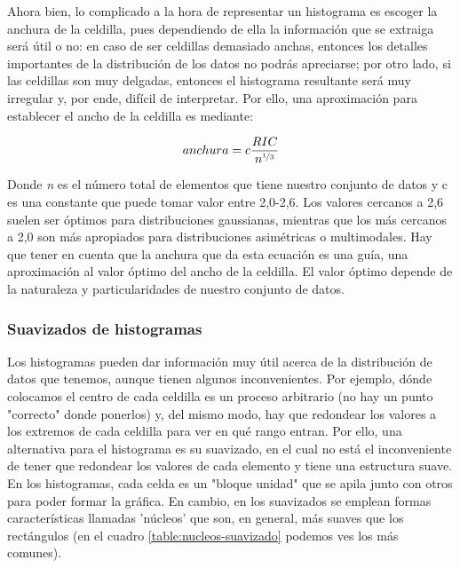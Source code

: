 \documentclass[12pt]{article}
\begin{document}
Ahora bien, lo complicado a la hora de representar un histograma es escoger la anchura de la celdilla, pues dependiendo de ella la información que se extraiga será útil o no: en caso de ser celdillas demasiado anchas, entonces los detalles importantes de la distribución de los datos no podrás apreciarse; por otro lado, si las celdillas son muy delgadas, entonces el histograma resultante será muy irregular y, por ende, difícil de interpretar. Por ello, una aproximación para establecer el ancho de la celdilla es mediante:

\begin{equation}
anchura = c \frac{RIC}{n^{\nicefrac{1}{3}}}
\label{eq:bin_width}
\end{equation}

Donde \textit{n} es el número total de elementos que tiene nuestro conjunto de datos y c es una constante que puede tomar valor entre 2,0-2,6. Los valores cercanos a 2,6 suelen ser óptimos para distribuciones gaussianas, mientras que los más cercanos a 2,0 son más apropiados para distribuciones asimétricas o multimodales. Hay que tener en cuenta que la anchura que da esta ecuación es una guía, una aproximación al valor óptimo del ancho de la celdilla. El valor óptimo depende de la naturaleza y particularidades de nuestro conjunto de datos.

\subsubsection{Suavizados de histogramas}

Los histogramas pueden dar información muy útil acerca de la distribución de datos que tenemos, aunque tienen algunos inconvenientes. Por ejemplo, dónde colocamos el centro de cada celdilla es un proceso arbitrario (no hay un punto "correcto" donde ponerlos) y, del mismo modo, hay que redondear los valores a los extremos de cada celdilla para ver en qué rango entran. Por ello, una alternativa para el histograma es su suavizado, en el cual no está el inconveniente de tener que redondear los valores de cada elemento y tiene una estructura suave. En los histogramas, cada celda es un "bloque unidad" que se apila junto con otros para poder formar la gráfica. En cambio, en los suavizados se emplean formas características llamadas 'núcleos' que son, en general, más suaves que los rectángulos (en el cuadro \ref{table:nucleos-suavizado} podemos ves los más comunes).
\end{document}
